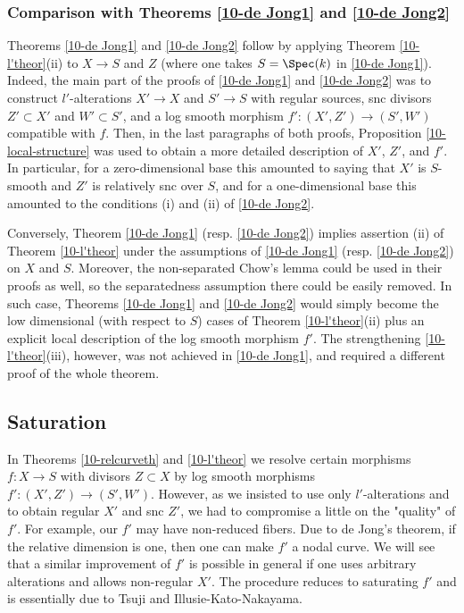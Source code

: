 \documentclass[10pt]{../fichiers-configuration-latex/smfart}
\begin{document}
\subsubsection{Comparison with Theorems \ref{10-de Jong1} and \ref{10-de Jong2}}
Theorems \ref{10-de Jong1} and \ref{10-de Jong2} follow by applying Theorem \ref{10-l'theor}(ii)
to $X\to S$ and $Z$ (where one takes $S=\Spec(k)$ in \ref{10-de Jong1}). Indeed,
the main part of the proofs of \ref{10-de Jong1} and \ref{10-de Jong2} was to
construct $l'$-alterations $X'\to X$ and $S'\to S$ with regular sources, snc
divisors $Z'\subset X'$ and $W'\subset S'$, and a log smooth morphism
$f'{\colon}(X',Z')\to(S',W')$ compatible with $f$. Then, in the last paragraphs
of both proofs, Proposition \ref{10-local-structure} was used to obtain a more
detailed description of $X'$, $Z'$, and $f'$. In particular, for a zero-dimensional
base this amounted to saying that $X'$ is $S$-smooth and $Z'$ is relatively snc over
$S$, and for a one-dimensional base this amounted to the conditions (i) and (ii)
of \ref{10-de Jong2}.

Conversely, Theorem \ref{10-de Jong1} (resp. \ref{10-de Jong2}) implies assertion (ii)
of Theorem \ref{10-l'theor} under the assumptions of \ref{10-de Jong1} (resp. \ref{10-de Jong2})
on $X$ and $S$. Moreover, the non-separated Chow's lemma could be used in their proofs as well,
so the separatedness assumption there could be easily removed. In such case,
Theorems \ref{10-de Jong1} and \ref{10-de Jong2} would simply become the low
dimensional (with respect to $S$) cases of Theorem  \ref{10-l'theor}(ii) plus
an explicit local description of the log smooth morphism $f'$. The strengthening
\ref{10-l'theor}(iii), however, was not achieved in \ref{10-de Jong1}, and required
a different proof of the whole theorem.

\subsection{Saturation}\label{10-satursec} In Theorems \ref{10-relcurveth} and \ref{10-l'theor}
we resolve certain morphisms $f{\colon}X\to S$ with divisors $Z\subset X$ by log smooth morphisms
$f'{\colon}(X',Z')\to(S',W')$. However, as we insisted to use only $l'$-alterations and to obtain
regular $X'$ and snc $Z'$, we had to compromise a little on the "quality" of $f'$. For example,
our $f'$ may have non-reduced fibers. Due to de Jong's theorem, if the relative dimension is one,
then one can make $f'$ a nodal curve. We will see that a similar improvement of $f'$ is possible
in general if one uses arbitrary alterations and allows non-regular $X'$. The procedure reduces
to saturating $f'$ and is essentially due to Tsuji and Illusie-Kato-Nakayama.
\end{document}
